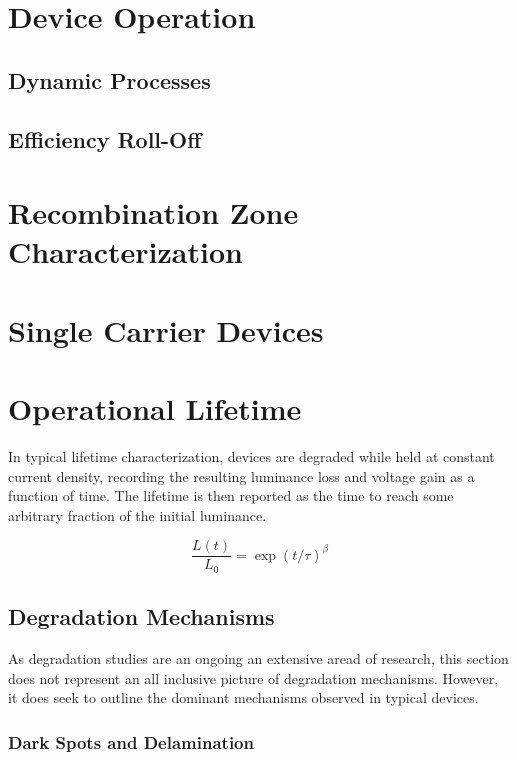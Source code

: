\documentclass[../thesis.tex]{subfiles}
\begin{document}
\section{Device Operation}
\subsection{Dynamic Processes}
\subsection{Efficiency Roll-Off}

\section{Recombination Zone Characterization}\label{sec:rz_measurement}

\section{Single Carrier Devices}

\section{Operational Lifetime}
In typical lifetime characterization, devices are degraded while held at constant current density, recording the resulting luminance loss and voltage gain as a function of time.  
The lifetime is then reported as the time to reach some arbitrary fraction of the initial luminance.

\begin{equation}
\frac{L(t)}{L_0}=\exp (t/\tau)^\beta
\label{eqn:stretched_exponential}
\end{equation}

\subsection{Degradation Mechanisms}\label{sec:degradation_mechanisms}

As degradation studies are an ongoing an extensive aread of research, this section does not represent an all inclusive picture of degradation mechanisms.  However, it does seek to outline the dominant mechanisms observed in typical devices.

\subsubsection{Dark Spots and Delamination}
\end{document}
